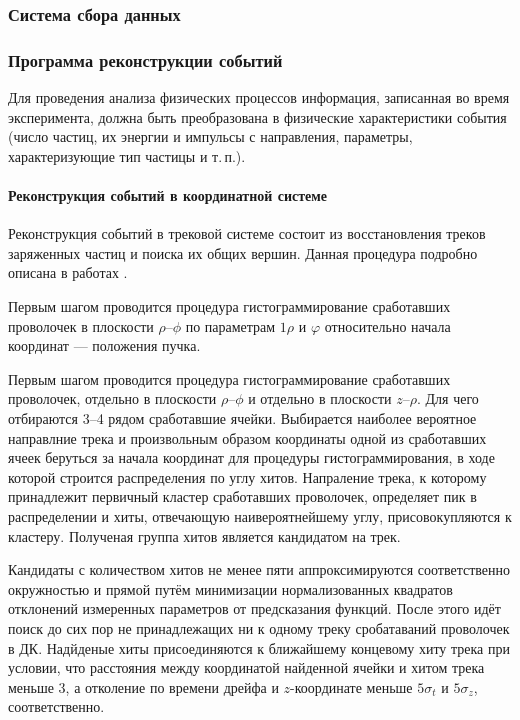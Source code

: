 \subsubsection{Система сбора данных}
\label{sec:daq}





\subsubsection{Программа реконструкции событий}
\label{sec:event_reco}


Для проведения анализа физических процессов информация,
записанная во время эксперимента,
должна быть преобразована в физические характеристики события
(число частиц,
их энергии и импульсы с направления,
параметры,
характеризующие тип частицы и т.\,п.).


\paragraph{Реконструкция событий в координатной системе}

Реконструкция событий в трековой системе состоит из восстановления треков заряженных частиц и поиска их общих вершин.
Данная процедура подробно описана в работах \cite{Karawdina:2007:track_reco}.


Первым шагом проводится процедура гистограммирование сработавших проволочек
в плоскости $\rho$--$\phi$ по параметрам $1\rho$ и $\varphi$ относительно начала координат
--- положения пучка.

Первым шагом проводится процедура гистограммирование сработавших проволочек,
отдельно в плоскости $\rho$--$\phi$ и отдельно в плоскости $z$--$\rho$.
Для чего отбираются 3--4 рядом сработавшие ячейки.
Выбирается наиболее вероятное направлние трека и произвольным образом координаты одной из сработавших ячеек беруться за начала координат для процедуры гистограммирования,
в ходе которой строится распределения по углу хитов.
Напраление трека,
к которому принадлежит первичный кластер сработавших проволочек,
определяет пик в распределении и хиты,
отвечающую наивероятнейшему углу,
присовокупляются к кластеру.
Полученая группа хитов является кандидатом на трек.

Кандидаты с количеством хитов не менее пяти аппроксимируются соответственно окружностью и прямой
путём минимизации нормализованных квадратов отклонений измеренных параметров от предсказания функций.
После этого идёт поиск до сих пор не принадлежащих ни к одному треку сробатаваний проволочек в ДК.
Надйденые хиты присоединяются к ближайшему концевому хиту трека при условии,
что расстояния между координатой найденной ячейки и хитом трека меньше \SI{3}{\cmr},
а отколение по времени дрейфа и $z$-координате меньше $5 \sigma_t$
и $5 \sigma_z$, соответственно.




